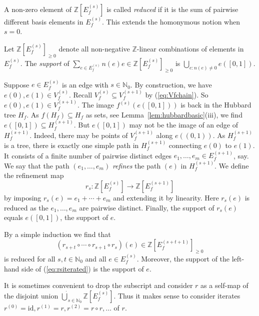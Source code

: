 \documentclass[12pt,oneside,a4]{amsart}
\newcommand{\IN}{\mathbb{N}}
\newcommand{\IZ}{\mathbb{Z}}
\numberwithin{maincounter}{section}
\numberwithin{equation}{section}
\renewcommand{\subset}{\subseteq}
\begin{document}
A non-zero element of $\IZ[E_f^{(s)}]$ is called \textit{reduced} if
it is the sum of pairwise different basis elements in $E_f^{(s)}$.
This extends the homonymous notion when $s=0$.

Let $\IZ[E_f^{(s)}]_{\ge 0}$ denote all non-negative $\IZ$-linear
combinations of elements in $E_f^{(s)}$. The \textit{support} of
$\sum_{e\in E_f^{(s)}} n(e) e \in \IZ[E^{(s)}_f]_{\ge 0}$ is
$\bigcup_{e:n(e)\not=0} e([0,1])$.

Suppose $e\in E_f^{(s)}$ is an edge with  $s\in\IN_0$. By construction, we have
$e(0),e(1)\in V_f^{(s)}$. 
Recall $V_f^{(s)}\subset V_f^{(s+1)}$ by (\ref{eq:Vfchain}). So $e(0),e(1)\in
V_f^{(s+1)}$.
The image  $f^{(s)}(e([0,1]))$ is back in the Hubbard tree  $H_f$.
As $f(H_f)\subset H_f$ as sets, see
Lemma~\ref{lem:hubbardbasic}(iii), we find $e([0,1]) \subset
H_f^{(s+1)}$.
But $e([0,1])$ may not be the image of an edge
of $H_f^{(s+1)}$. Indeed, there may be  points of $V_f^{(s+1)}$
along $e((0,1))$.
As $H_f^{(s+1)}$ is a tree,
there is exactly one simple path in
$H_f^{(s+1)}$ connecting $e(0)$ to $e(1)$. It consists of a finite
number of pairwise distinct edges $e_1,\ldots,e_m \in E_f^{(s+1)}$,
say. We say that the path $(e_1,\ldots,e_m)$ \textit{refines} the path $(e)$ in
$H_f^{(s+1)}$. We define the refinement map
\begin{equation*}
  r_s \colon \IZ[E_f^{(s)}]\rightarrow \IZ[E_f^{(s+1)}]
\end{equation*}
by imposing $r_s(e) = e_1+\cdots + e_m$ and extending it by linearity. 
Here $r_s(e)$ is reduced as the $e_1,\ldots,e_m$ are pairwise
distinct. Finally, the support of $r_s(e)$ equals $e([0,1])$, the
support of $e$.

By a simple induction we find that 
\begin{equation}
  \label{eq:rsiterated}
  (r_{s+t} \circ \cdots \circ r_{s+1}\circ r_s)(e) \in
  \IZ[E_f^{(s+t+1)}]_{\ge 0}
\end{equation}
is reduced for all $s,t\in\IN_0$ and all $e\in E_f^{(s)}$. Moreover,
the support of the left-hand side of (\ref{eq:rsiterated}) is the
support of $e$.

It is sometimes convenient to drop the subscript and
consider $r$ as a self-map of the disjoint  union
$\dot\bigcup_{s\in\IN_0} \IZ[E_f^{(s)}]$.
Thus it makes sense to consider iterates $r^{(0)}=\mathrm{id},r^{(1)}=r,r^{(2)} =
r\circ r,\ldots$ of $r$.
\end{document}
